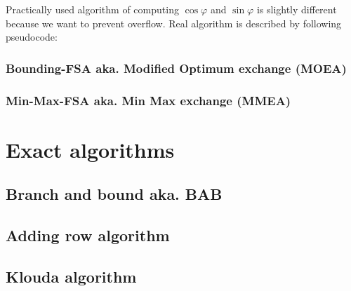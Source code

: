 Practically used algorithm of computing $\cos{\varphi}$ and  $\sin{\varphi}$ is slightly different because we want to prevent overflow. Real algorithm is described by following pseudocode:







\subsection{Bounding-FSA aka. Modified Optimum exchange (MOEA)}
\subsection{Min-Max-FSA aka. Min Max exchange (MMEA)}




\chapter{Exact algorithms} %

\section{Branch and bound aka. BAB}  %
\section{Adding row algorithm} %
\section{Klouda algorithm}


